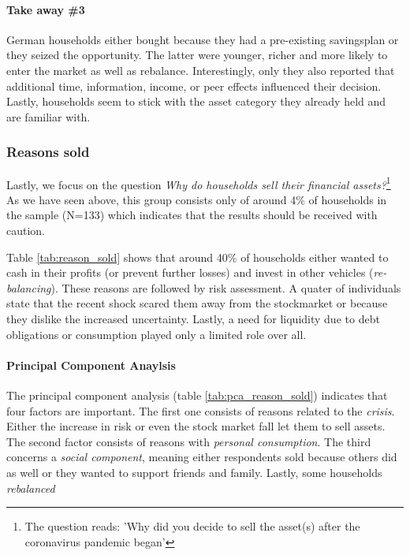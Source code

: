 \documentclass[ProjectABM]{subfiles}
\begin{document}


\paragraph{Take away \#3}
German households either bought because they had a pre-existing savingsplan or they seized the opportunity. The latter were younger, richer and more likely to enter the market as well as rebalance. Interestingly, only they also reported that additional time, information, income, or peer effects influenced their decision. Lastly, households seem to stick with the asset category they already held and are familiar with.

\subsubsection{Reasons sold}
Lastly, we focus on the question \textit{Why do households sell their financial assets?}\footnote{The question reads: 'Why did you decide to sell the asset(s) after the coronavirus pandemic began'} As we have seen above, this group consists only of around 4\% of households in the sample (N=133) which indicates that the results should be received with caution.



Table \ref{tab:reason_sold} shows that around 40\% of households either wanted to cash in their profits (or prevent further losses) and invest in other vehicles (\textit{re-balancing}). These reasons are followed by risk assessment. A quater of individuals state that the recent shock scared them away from the stockmarket or because they dislike the increased uncertainty. Lastly, a need for liquidity due to debt obligations or consumption played only a limited role over all. %

\paragraph{Principal Component Anaylsis}
The principal component analysis (table \ref{tab:pca_reason_sold}) indicates that four factors are important. The first one consists of reasons related to the \textit{crisis}. Either the increase in risk or even the stock market fall let them to sell assets. The second factor consists of reasons with \textit{personal consumption}. The third concerns a \textit{social component}, meaning either respondents sold because others did as well or they wanted to support friends and family. Lastly, some households \textit{rebalanced}
\end{document}
